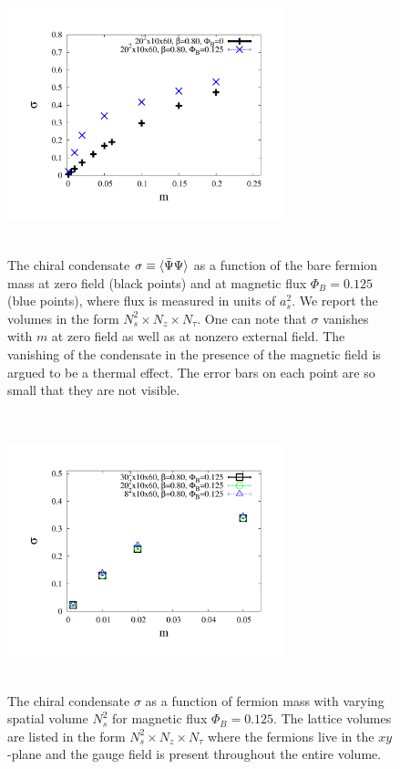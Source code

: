 \documentclass[aps,prd,twocolumn,showpacs,superscriptaddress,groupedaddress]{revtex4}  %
\begin{document}
\begin{figure}
\includegraphics[height=8cm,width=8cm]{pbp_vs_m_compare_graphene_paper.pdf} \hspace{-1cm}
\caption{The chiral condensate $\sigma \equiv {\langle {\bar \Psi}\Psi \rangle}$ as a function of the bare fermion mass at zero field (black points) and at magnetic flux $\Phi_B=0.125$ (blue points), where flux is measured in units of $a^2_s$. We report the volumes in the form $N^2_s \times N_z \times N_{\tau}$.  One can note that $\sigma$ vanishes with $m$ at zero field as well as at nonzero external field. The vanishing of the condensate in the presence of the magnetic field is argued to be a thermal effect. The error bars on each point are so small that they are not visible.}
\label{PBPComparison}
\end{figure}

\begin{figure}
\includegraphics[height=8cm,width=8cm]{pbp_vs_m_PHI0125_volcompare_3_graphene_paper.pdf} \hspace{-1cm}
\caption{The chiral condensate $\sigma$ as a function of fermion mass with varying spatial volume $N^2_s$ for magnetic flux $\Phi_B=0.125$. The lattice volumes are listed in the form $N_s^2\times N_z \times N_{\tau}$ where the fermions live in the $xy$-plane and the gauge field is present throughout the entire volume.}
\label{PBPVolume}
\end{figure}
\end{document}
